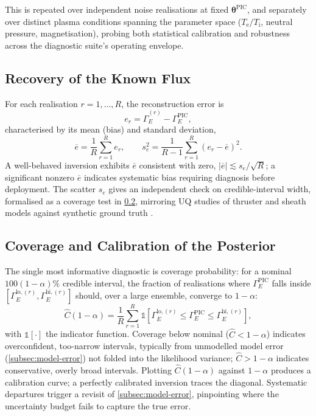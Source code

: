 This is repeated over independent noise realisations at fixed $\boldsymbol{\theta}^{\text{PIC}}$, and separately over distinct plasma conditions spanning the parameter space ($T_{\mathrm{e}}/T_{\mathrm{i}}$, neutral pressure, magnetisation), probing both statistical calibration and robustness across the diagnostic suite's operating envelope.

\subsection{Recovery of the Known Flux}
\label{subsec:recovery}

For each realisation $r = 1, \dots, R$, the reconstruction error is
\begin{equation}
e_{r} = \hat{\Gamma}_{E}^{(r)} - \Gamma_{E}^{\text{PIC}},
\label{eq:recon-error}
\end{equation}
characterised by its mean (bias) and standard deviation,
\begin{equation}
\overline{e} = \frac{1}{R} \sum_{r=1}^{R} e_{r}, \qquad
s_{e}^{2} = \frac{1}{R-1} \sum_{r=1}^{R} \left(e_{r} - \overline{e}\right)^{2}.
\label{eq:bias-scatter}
\end{equation}
A well-behaved inversion exhibits $\overline{e}$ consistent with zero, $|\overline{e}| \lesssim s_{e} / \sqrt{R}$; a significant nonzero $\overline{e}$ indicates systematic bias requiring diagnosis before deployment. The scatter $s_{e}$ gives an independent check on credible-interval width, formalised as a coverage test in \cref{subsec:coverage}, mirroring UQ studies of thruster and sheath models against synthetic ground truth \cite{ref0719,ref0712}.

\subsection{Coverage and Calibration of the Posterior}
\label{subsec:coverage}

The single most informative diagnostic is coverage probability: for a nominal $100(1-\alpha)\%$ credible interval, the fraction of realisations where $\Gamma_{E}^{\text{PIC}}$ falls inside $\left[\Gamma_{E}^{\text{lo},(r)}, \Gamma_{E}^{\text{hi},(r)}\right]$ should, over a large ensemble, converge to $1-\alpha$:
\begin{equation}
\widehat{C}(1-\alpha) = \frac{1}{R} \sum_{r=1}^{R} \mathbb{1}\!\left[\Gamma_{E}^{\text{lo},(r)} \le \Gamma_{E}^{\text{PIC}} \le \Gamma_{E}^{\text{hi},(r)}\right],
\label{eq:coverage}
\end{equation}
with $\mathbb{1}[\cdot]$ the indicator function. Coverage below nominal ($\widehat{C} < 1-\alpha$) indicates overconfident, too-narrow intervals, typically from unmodelled model error (\cref{subsec:model-error}) not folded into the likelihood variance; $\widehat{C} > 1-\alpha$ indicates conservative, overly broad intervals. Plotting $\widehat{C}(1-\alpha)$ against $1-\alpha$ produces a calibration curve; a perfectly calibrated inversion traces the diagonal. Systematic departures trigger a revisit of \cref{subsec:model-error}, pinpointing where the uncertainty budget fails to capture the true error.

